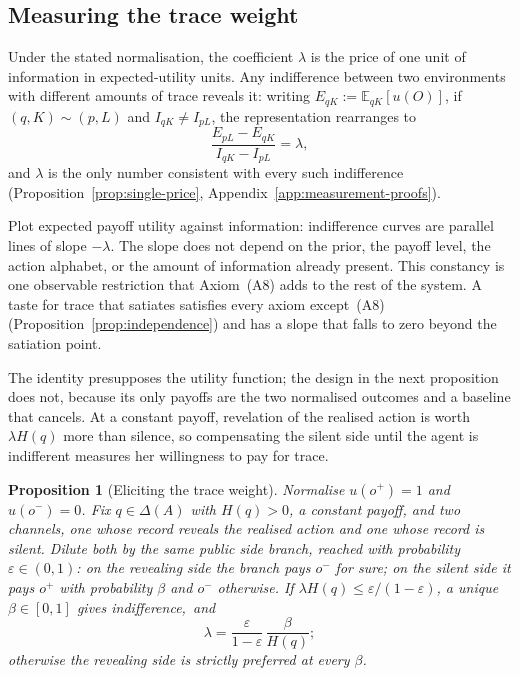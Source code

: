 \documentclass[11pt,a4paper]{article}
\newtheorem{proposition}[theorem]{Proposition}
\theoremstyle{definition}
\newcommand{\D}{\Delta}
\newcommand{\E}{\mathbb E}
\newcommand{\I}{I}
\newcommand{\Sh}{H}
\newcommand{\1}{\mathbf 1}
\begin{document}
\subsection{Measuring the trace weight}\label{sec:measurement}

Under the stated normalisation, the coefficient $\lambda$ is the price of one unit of information in expected-utility units.  Any indifference
between two environments with different amounts of trace reveals it: writing $E_{qK}:=\E_{qK}[u(O)]$, if
$(q,K)\sim(p,L)$ and $\I_{qK}\ne\I_{pL}$, the representation rearranges to
\[
 \frac{E_{pL}-E_{qK}}{\I_{qK}-\I_{pL}}=\lambda,
\]
and $\lambda$ is the only number consistent with every such indifference
(Proposition~\ref{prop:single-price}, Appendix~\ref{app:measurement-proofs}).

Plot expected payoff utility against information: indifference curves are parallel lines of slope $-\lambda$.  The slope does
not depend on the prior, the payoff level, the action alphabet, or the amount of information already present.
This constancy is one observable restriction that Axiom~\textup{(A8)} adds to the rest of the system.  A taste for trace that satiates satisfies every axiom except~\textup{(A8)} (Proposition~\ref{prop:independence}) and has a slope that falls to zero beyond the satiation point.


The identity presupposes the utility function; the design in the next proposition does not, because its only
payoffs are the two normalised outcomes and a baseline that cancels.  At a constant payoff, revelation of the
realised action is worth $\lambda\Sh(q)$ more than silence, so compensating the silent side until the agent is
indifferent measures her willingness to pay for trace.

\begin{proposition}[Eliciting the trace weight]\label{prop:elicit}
Normalise $u(o^+)=1$ and $u(o^-)=0$.  Fix $q\in\D(A)$ with $\Sh(q)>0$, a constant payoff, and two channels, one
whose record reveals the realised action and one whose record is silent.  Dilute both by the same public side
branch, reached with probability $\varepsilon\in(0,1)$: on the revealing side the branch pays $o^-$ for sure; on
the silent side it pays $o^+$ with probability $\beta$ and $o^-$ otherwise.  If
$\lambda\Sh(q)\le\varepsilon/(1-\varepsilon)$, a unique $\beta\in[0,1]$ gives indifference,~and
\[
 \lambda=\frac{\varepsilon}{1-\varepsilon}\,\frac{\beta}{\Sh(q)};
\]
otherwise the revealing side is strictly preferred at every $\beta$.
\end{proposition}
\end{document}
